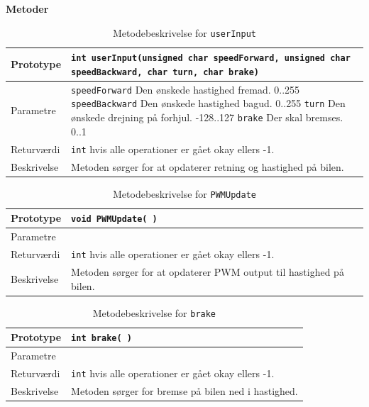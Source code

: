 \newpage
\textbf{Metoder} 



\begin{table}[H]
\begin{tabularx}{\textwidth}{| L{2.5 cm} | Z |} \hline
Prototype & \texttt{int userInput(unsigned char speedForward, unsigned char speedBackward, 
	char turn, char brake)} \\\hline
Parametre & \texttt{speedForward} \newline Den ønskede hastighed fremad. 0..255\newline
		\texttt{speedBackward} \newline Den ønskede hastighed bagud. 0..255\newline
		\texttt{turn} \newline Den ønskede drejning på forhjul. -128..127\newline
		\texttt{brake} \newline Der skal bremses. 0..1\newline 
 \\\hline
Returværdi &  \texttt{int}  hvis alle operationer er gået okay ellers -1. \\\hline
Beskrivelse & Metoden sørger for at opdaterer retning og hastighed på bilen. \\\hline
\end{tabularx}
\caption{Metodebeskrivelse for \texttt{userInput}}
\label{table:met_userInput}
\end{table}



\begin{table}[H]
	\begin{tabularx}{\textwidth}{| L{2.5 cm} | Z |} \hline
		Prototype & \texttt{void PWMUpdate( )} \\\hline
		Parametre &   
		\\\hline
		Returværdi &  \texttt{int}  hvis alle operationer er gået okay ellers -1. \\\hline
		Beskrivelse & Metoden sørger for at opdaterer PWM output til hastighed på bilen. \\\hline
	\end{tabularx}
	\caption{Metodebeskrivelse for \texttt{PWMUpdate}}
	\label{table:met_PWMUpdate}
\end{table}

\begin{table}[H]
	\begin{tabularx}{\textwidth}{| L{2.5 cm} | Z |} \hline
		Prototype & \texttt{int brake( )} \\\hline
		Parametre & 
		\\\hline
		Returværdi &  \texttt{int}  hvis alle operationer er gået okay ellers -1. \\\hline
		Beskrivelse & Metoden sørger for bremse på bilen ned i hastighed. \\\hline
	\end{tabularx}
	\caption{Metodebeskrivelse for \texttt{brake}}
	\label{table:met_brake}
\end{table}

